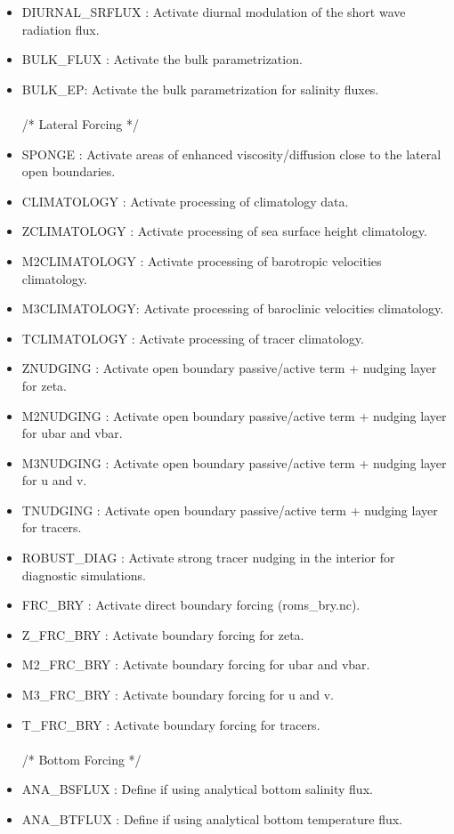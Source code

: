 \begin{itemize}
\item DIURNAL\_SRFLUX : Activate diurnal modulation of the short wave radiation flux.
\item BULK\_FLUX : Activate the bulk parametrization.
\item BULK\_EP: Activate the bulk parametrization for salinity fluxes.
\\ \\ /*                       Lateral Forcing */
\item SPONGE : Activate areas of enhanced viscosity/diffusion close to the 
lateral open boundaries.
\item CLIMATOLOGY : Activate processing of climatology data.
\item ZCLIMATOLOGY : Activate processing of  sea surface height climatology.
\item M2CLIMATOLOGY : Activate processing of  barotropic velocities climatology.
\item M3CLIMATOLOGY: Activate processing of  baroclinic velocities climatology.
\item TCLIMATOLOGY : Activate processing of tracer climatology.
\item ZNUDGING : Activate open boundary passive/active term + nudging layer for zeta.
\item M2NUDGING : Activate open boundary passive/active term + nudging layer for ubar and vbar.
\item M3NUDGING : Activate open boundary passive/active term + nudging layer for u and v.
\item TNUDGING : Activate open boundary passive/active term + nudging layer for tracers.
\item ROBUST\_DIAG : Activate strong tracer nudging in the interior for diagnostic simulations.
\item FRC\_BRY : Activate direct boundary forcing (roms\_bry.nc).
\item Z\_FRC\_BRY : Activate boundary forcing for zeta.
\item M2\_FRC\_BRY : Activate boundary forcing for ubar and vbar.
\item M3\_FRC\_BRY : Activate boundary forcing for u and v.
\item T\_FRC\_BRY : Activate boundary forcing for tracers.
\\ \\ /*                       Bottom Forcing */
\item ANA\_BSFLUX : Define if using analytical bottom salinity flux.
\item ANA\_BTFLUX : Define if using analytical bottom temperature flux.

\end{itemize}
